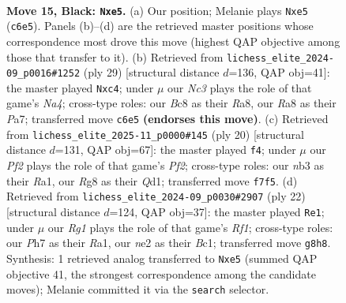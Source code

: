 \documentclass[11pt]{article}
\begin{document}
\clearpage

\begin{figure}[p]\centering
\begin{subfigure}{0.46\textwidth}\centering
\resizebox{\linewidth}{!}{%
\newchessgame
\chessboard[
  setfen={r1b2kr1/1p1qbp1p/p1n3p1/2PpP2n/8/1N6/PP1KNPPP/1RBQ1B1R b - - 0 15},
  showmover=false,
  pgfstyle=straightmove, color=movearrow, markmove={c6-e5}
]}
\caption{}
\end{subfigure}\hfill
\begin{subfigure}{0.46\textwidth}\centering
\resizebox{\linewidth}{!}{%
\newchessgame
\chessboard[
  setfen={r1b1k2r/p1q2pp1/3b1n1p/n7/2P5/3N3P/P1P1BPP1/RNBQK2R b KQkq - 0 15},
  showmover=false,
  pgfstyle=straightmove, color=movearrow, markmove={a5-c4}
]}
\caption{}
\end{subfigure}
\\[4pt]
\begin{subfigure}{0.46\textwidth}\centering
\resizebox{\linewidth}{!}{%
\newchessgame
\chessboard[
  setfen={r1bqkb1r/3n1ppp/pn1pp3/1p4P1/3NP2P/P1N1B3/1PP2P2/R2QKB1R w KQkq - 3 11},
  showmover=false,
  pgfstyle=straightmove, color=movearrow, markmove={f2-f4}
]}
\caption{}
\end{subfigure}\hfill
\begin{subfigure}{0.46\textwidth}\centering
\resizebox{\linewidth}{!}{%
\newchessgame
\chessboard[
  setfen={r2qk2r/pp1bbppp/4pn2/8/3N4/2P5/PPB2PPP/R1BQ1RK1 w kq - 3 12},
  showmover=false,
  pgfstyle=straightmove, color=movearrow, markmove={f1-e1}
]}
\caption{}
\end{subfigure}
\caption{\textbf{Move 15, Black: \texttt{Nxe5}.} (a) Our position; Melanie plays \texttt{Nxe5} (\texttt{c6e5}). Panels (b)--(d) are the retrieved master positions whose correspondence most drove this move (highest QAP objective among those that transfer to it). (b) Retrieved from \texttt{lichess\_elite\_2024-09\_p0016\#1252} (ply 29) [structural distance $d$=136, QAP obj=41]: the master played \texttt{Nxc4}; under $\mu$ our \emph{Nc3} plays the role of that game's \emph{Na4}; cross-type roles: our \emph{B}c8 as their \emph{R}a8, our \emph{R}a8 as their \emph{P}a7; transferred move \texttt{c6e5} \textbf{(endorses this move)}. (c) Retrieved from \texttt{lichess\_elite\_2025-11\_p0000\#145} (ply 20) [structural distance $d$=131, QAP obj=67]: the master played \texttt{f4}; under $\mu$ our \emph{Pf2} plays the role of that game's \emph{Pf2}; cross-type roles: our \emph{n}b3 as their \emph{R}a1, our \emph{R}g8 as their \emph{Q}d1; transferred move \texttt{f7f5}. (d) Retrieved from \texttt{lichess\_elite\_2024-09\_p0030\#2907} (ply 22) [structural distance $d$=124, QAP obj=37]: the master played \texttt{Re1}; under $\mu$ our \emph{Rg1} plays the role of that game's \emph{Rf1}; cross-type roles: our \emph{P}h7 as their \emph{R}a1, our \emph{n}e2 as their \emph{B}c1; transferred move \texttt{g8h8}. Synthesis: 1 retrieved analog transferred to \texttt{Nxe5} (summed QAP objective 41, the strongest correspondence among the candidate moves); Melanie committed it via the \texttt{search} selector.}
\label{fig:thought-m29}
\end{figure}
\end{document}
